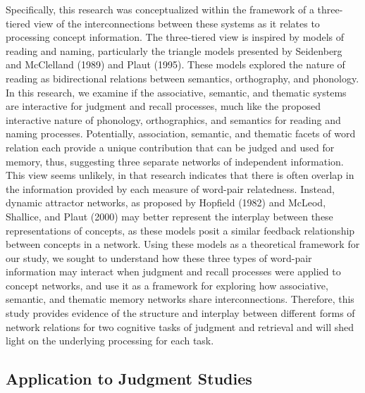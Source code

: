 \documentclass[english,,man]{apa6}
\begin{document}
Specifically, this research was conceptualized within the framework of a
three-tiered view of the interconnections between these systems as it
relates to processing concept information. The three-tiered view is
inspired by models of reading and naming, particularly the triangle
models presented by Seidenberg and McClelland (1989) and Plaut (1995).
These models explored the nature of reading as bidirectional relations
between semantics, orthography, and phonology. In this research, we
examine if the associative, semantic, and thematic systems are
interactive for judgment and recall processes, much like the proposed
interactive nature of phonology, orthographics, and semantics for
reading and naming processes. Potentially, association, semantic, and
thematic facets of word relation each provide a unique contribution that
can be judged and used for memory, thus, suggesting three separate
networks of independent information. This view seems unlikely, in that
research indicates that there is often overlap in the information
provided by each measure of word-pair relatedness. Instead, dynamic
attractor networks, as proposed by Hopfield (1982) and McLeod, Shallice,
and Plaut (2000) may better represent the interplay between these
representations of concepts, as these models posit a similar feedback
relationship between concepts in a network. Using these models as a
theoretical framework for our study, we sought to understand how these
three types of word-pair information may interact when judgment and
recall processes were applied to concept networks, and use it as a
framework for exploring how associative, semantic, and thematic memory
networks share interconnections. Therefore, this study provides evidence
of the structure and interplay between different forms of network
relations for two cognitive tasks of judgment and retrieval and will
shed light on the underlying processing for each task.

\subsection{Application to Judgment
Studies}\label{application-to-judgment-studies}
\end{document}
